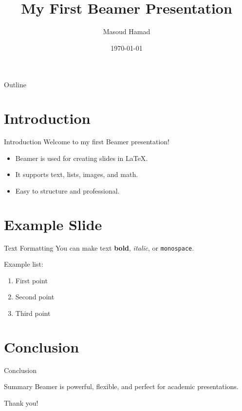 \documentclass{beamer}
\title{My First Beamer Presentation}
\author{Masoud Hamad}
\institute{State University of Zanzibar (SUZA)}
\date{\today}
\begin{document}
\begin{frame}
  \titlepage
\end{frame}

\begin{frame}{Outline}
  \tableofcontents
\end{frame}

\section{Introduction}
\begin{frame}{Introduction}
  Welcome to my first Beamer presentation!
  \begin{itemize}
    \item Beamer is used for creating slides in LaTeX.
    \item It supports text, lists, images, and math.
    \item Easy to structure and professional.
  \end{itemize}
\end{frame}

\section{Example Slide}
\begin{frame}{Text Formatting}
  You can make text \textbf{bold}, \textit{italic}, or \texttt{monospace}.
  \vspace{1em}

  Example list:
  \begin{enumerate}
    \item First point
    \item Second point
    \item Third point
  \end{enumerate}
\end{frame}

\section{Conclusion}
\begin{frame}{Conclusion}
  \begin{block}{Summary}
    Beamer is powerful, flexible, and perfect for academic presentations.
  \end{block}
  Thank you!
\end{frame}
\end{document}

